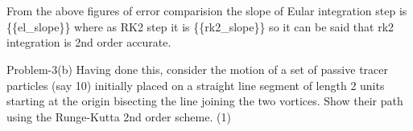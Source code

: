 \documentclass[11pt]{article}
\begin{document}
    \begin{center}
    \end{center}
    { \hspace*{\fill} \\}
    
    \begin{center}
    \end{center}
    { \hspace*{\fill} \\}
    
    From the above figures of error comparision the slope of Eular
integration step is \{\{el\_slope\}\} where as RK2 step it is
\{\{rk2\_slope\}\} so it can be said that rk2 integration is 2nd order
accurate.

Problem-3(b) Having done this, consider the motion of a set of passive
tracer particles (say 10) initially placed on a straight line segment of
length 2 units starting at the origin bisecting the line joining the two
vortices. Show their path using the Runge-Kutta 2nd order scheme. (1)
\end{document}
